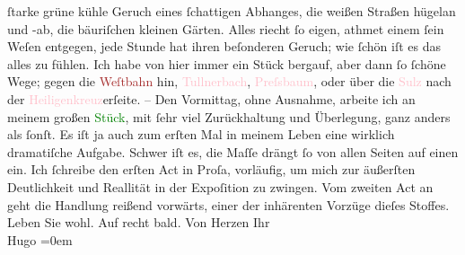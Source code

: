                ſtarke grüne kühle Geruch eines ſchattigen Abhanges, die weißen Straßen hügelan und
               -ab, die bäuriſchen kleinen Gärten. Alles riecht ſo eigen, athmet einem ſein {\pb}Weſen entgegen, jede Stunde hat
               ihren beſonderen Geruch; wie ſchön iſt es das alles zu fühlen.\pend
           \pstart
           Ich habe von hier immer ein Stück bergauf, aber dann ſo ſchöne Wege; gegen die \textcolor{brown}{Weſtbahn}{}\ledrightnote{\textcolor{brown}{Westbahnstrecke}} hin, \textcolor{pink}{Tullnerbach}{}\ledrightnote{\textcolor{pink}{Tullnerbach}}, \textcolor{pink}{Preſsbaum}{}\ledrightnote{\textcolor{pink}{Pressbaum}}, oder über die \textcolor{pink}{Sulz}{}\ledrightnote{\textcolor{pink}{Sulz im Wienerwald}} nach der \textcolor{pink}{Heiligenkreuz}{}\ledrightnote{\textcolor{pink}{Heiligenkreuz}}erſeite.\pend
           \pstart
           \numberlinefalse{}–\numberlinetrue{}\pend
           \pstart
           Den Vormittag, ohne Ausnahme, arbeite ich an meinem großen \textcolor{green}{Stück}{}, mit ſehr viel Zurückhaltung und
               Überlegung, ganz anders als ſonſt. Es iſt {\pb}ja auch zum erſten Mal in meinem
               Leben eine wirklich dramatiſche Aufgabe. Schwer iſt es, die Maſſe drängt ſo von allen
               Seiten auf einen ein. Ich ſchreibe den erſten Act in Proſa, vorläufig, um mich zur
               äußerſten Deutlichkeit und Reallität in der Expoſition zu zwingen.\pend
           \pstart
           Vom zweiten Act an geht die Handlung reißend vorwärts, einer der inhärenten Vorzüge
               dieſes Stoffes.\pend
           \pstart
           Leben Sie wohl. Auf recht bald.\pend
           \pstart
           Von Herzen Ihr{\\[\baselineskip]}\spacefill\mbox{Hugo}\pend
           \leftskip=0em{}\endnumbering{}  
      